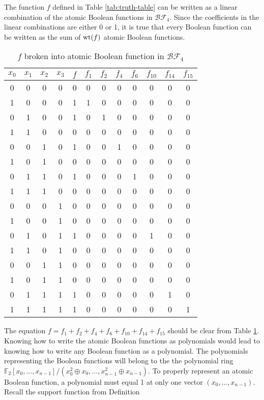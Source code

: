 \documentclass[english]{article}
\def\gftwo{\mathbb{F}_2}
\def\BF{\mathcal{BF}}
\theoremstyle{plain}
\theoremstyle{definition}
\theoremstyle{remark}
\begin{document}
\par The function $f$ defined in Table \ref{tab:truth-table} can be written
as a linear combination of the atomic Boolean functions in $\BF_4$. Since
the coefficients in the linear combinations are either 0 or 1, it is true
that every Boolean function can be written as the sum of ${\rm wt}(f)$ atomic
Boolean functions.
\begin{table}[h!]
  \centering
  \begin{tabular}{|c|c|c|c||c|c|c|c|c|c|c|c|}
    \hline
    $x_0$&$x_1$&$x_2$&$x_3$
      &$f$&$f_1$&$f_2$&$f_4$&$f_6$&$f_{10}$&$f_{14}$&$f_{15}$\\
    \hline
    0&0&0&0&0&0&0&0&0&0&0&0\\
    1&0&0&0&1&1&0&0&0&0&0&0\\
    0&1&0&0&1&0&1&0&0&0&0&0\\
    1&1&0&0&0&0&0&0&0&0&0&0\\
    0&0&1&0&1&0&0&1&0&0&0&0\\
    1&0&1&0&0&0&0&0&0&0&0&0\\
    0&1&1&0&1&0&0&0&1&0&0&0\\
    1&1&1&0&0&0&0&0&0&0&0&0\\
    0&0&0&1&0&0&0&0&0&0&0&0\\
    1&0&0&1&0&0&0&0&0&0&0&0\\
    0&1&0&1&1&0&0&0&0&1&0&0\\
    1&1&0&1&0&0&0&0&0&0&0&0\\
    0&0&1&1&0&0&0&0&0&0&0&0\\
    1&0&1&1&0&0&0&0&0&0&0&0\\
    0&1&1&1&1&0&0&0&0&0&1&0\\
    1&1&1&1&1&0&0&0&0&0&0&1\\
    \hline
  \end{tabular}
  \caption{$f$ broken into atomic Boolean function in $\BF_4$}
  \label{tab:atomic-f}
\end{table}
\par The equation $f=f_1+f_2+f_4+f_6+f_{10}+f_{14}+f_{15}$ should be clear
from Table \ref{tab:atomic-f}. Knowing how to write the atomic Boolean
functions as polynomials would lead to knowing how to write any Boolean
function as a polynomial. The polynomials representing the Boolean functions
will belong to the the polynomial ring $\gftwo[x_0,\dots,x_{n-1}]/
(x_0^2\oplus x_0,\dots,x_{n-1}^2\oplus x_{n-1})$. To properly represent
an atomic Boolean function, a polynomial must equal 1 at only one vector
$(x_0,\dots,x_{n-1})$. Recall the support function from Definition
\end{document}
